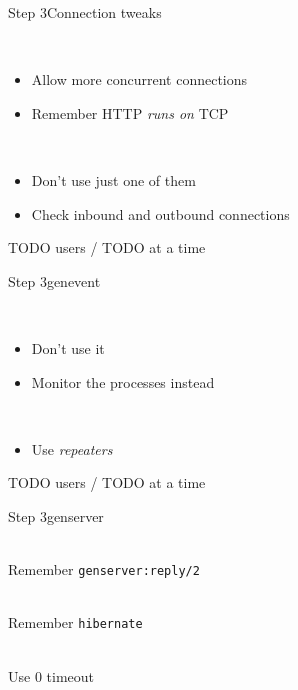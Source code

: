 \documentclass[utf8]{beamer}
\begin{document}
\begin{frame}{Step 3}{Connection tweaks}
	\begin{description}
		\item<+->[Backlog]\ \\
			\begin{itemize}
				\item Allow more concurrent connections
				\item Remember HTTP \emph{runs on} TCP
			\end{itemize}
		\item<+->[Connections]\ \\
			\begin{itemize}
				\item Don't use just one of them
				\item Check inbound and outbound connections
			\end{itemize}
	\end{description}
\end{frame}

\begin{frame}
TODO users / TODO at a time
\end{frame}

\begin{frame}{Step 3}{gen\textunderscore event}
	\begin{description}
		\item<+->[sup\textunderscore handler]\ \\
			\begin{itemize}
				\item Don't use it
				\item Monitor the processes instead
			\end{itemize}
		\item<+->[Long Delivery Queues]\ \\
			\begin{itemize}
				\item Use \emph{repeaters}
			\end{itemize}
	\end{description}
\end{frame}

\begin{frame}
TODO users / TODO at a time
\end{frame}

\begin{frame}{Step 3}{gen\textunderscore server}
	\begin{description}
		\item<+->[Call Timeouts]\ \\
			Remember \texttt{gen\textunderscore server:reply/2}
		\item<+->[Memory Footprint]\ \\
			Remember \texttt{hibernate}
		\item<+->[Long \texttt{init/1}]\ \\
			Use $0$ timeout
	\end{description}
\end{frame}
\end{document}
